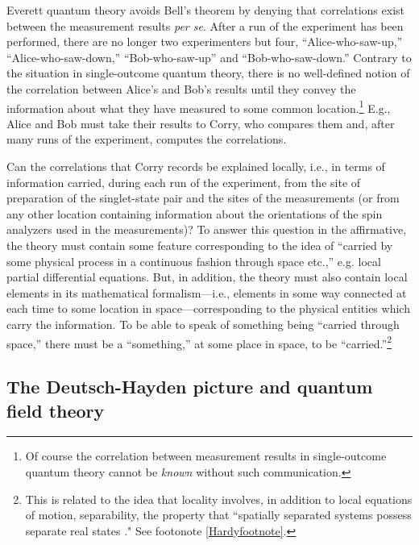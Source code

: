 \documentclass[12pt]{article}
\begin{document}
Everett quantum theory avoids Bell's theorem by denying that correlations exist between the measurement results {\em per se}\/.
After a run of the experiment has been performed, there are  no longer two experimenters but four, ``Alice-who-saw-up,'' ``Alice-who-saw-down,'' ``Bob-who-saw-up'' and  ``Bob-who-saw-down.'' Contrary to the situation in single-outcome quantum theory, there is no well-defined notion of the correlation between
Alice's and Bob's results until they convey the information about what they have measured to some common
location.\footnote{Of course  the correlation between measurement results in single-outcome quantum theory
cannot be {\em known}\/ without such communication.} E.g.,  Alice and Bob must take their results to
Corry, who compares them and, after many runs of the experiment, computes the correlations.

Can the correlations that Corry records be explained locally, i.e., in terms of information carried, during each run of the experiment, from the site of preparation of the singlet-state pair and the sites of the measurements (or from any other
location containing information about the orientations of the spin analyzers used in the measurements)?
To answer this question in the affirmative, the theory must contain some feature corresponding to the
idea of ``carried by some physical process in a continuous fashion through space etc.,'' e.g. local partial differential equations. But, in addition, the theory must also contain local elements in its mathematical formalism---i.e., elements in some way connected at each time to some location in space---corresponding to the physical entities which
carry the information. To be able to speak of something being ``carried through space,'' there must be a ``something,''
at some place in space, to be ``carried.''\footnote{This is related to the idea that locality involves, in addition to local equations of motion, separability, the property that ``spatially separated systems possess separate real states \cite{Howard1985} ." See footonote \ref{Hardyfootnote}.}

\subsection{The Deutsch-Hayden picture and quantum field theory} \label{SecDHPFT}
\end{document}
